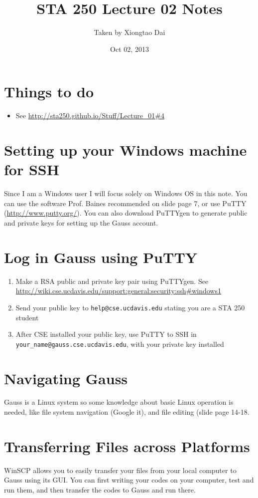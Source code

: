 \documentclass[]{article}
\title{STA 250 Lecture 02 Notes}
\author{Taken by Xiongtao Dai}
\date{Oct 02, 2013}
\begin{document}
\maketitle

\section{Things to do}
\begin{itemize}
	\item See \url{http://sta250.github.io/Stuff/Lecture_01#4}
\end{itemize}

\section{Setting up your Windows machine for SSH}
Since I am a Windows user I will focus solely on Windows OS in this note. You can use the software Prof. Baines recommended on slide page 7, or use PuTTY (\url{http://www.putty.org/}). You can also download PuTTYgen to generate public and private keys for setting up the Gauss account.

\section{Log in Gauss using PuTTY}
\begin{enumerate}
	\item Make a RSA public and private key pair using PuTTYgen. See \url{http://wiki.cse.ucdavis.edu/support:general:security:ssh#windows1}
	\item Send your public key to \texttt{help@cse.ucdavis.edu} stating you are a STA 250 student
	\item After CSE installed your public key, use PuTTY to SSH in \\ \texttt{your\_name@gauss.cse.ucdavis.edu}, with your private key installed
\end{enumerate}

\section{Navigating Gauss}
Gauss is a Linux system so some knowledge about basic Linux operation is needed, like file system navigation (Google it), and file editing (slide page 14-18.

\section{Transferring Files across Platforms}
WinSCP allows you to easily transfer your files from your local computer to Gauss using its GUI. You can first writing your codes on your computer, test and run them, and then transfer the codes to Gauss and run there. 
\end{document}
